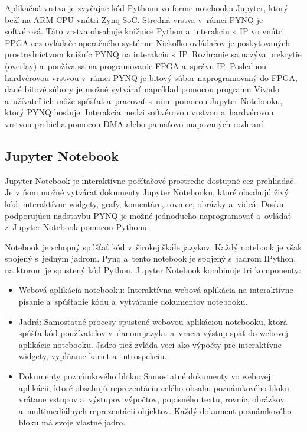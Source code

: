Aplikačná vrstva je zvyčajne kód Pythonu vo forme notebooku Jupyter, ktorý beží na ARM CPU vnútri Zynq SoC. Stredná vrstva v~rámci PYNQ je softvérová. Táto vrstva obsahuje knižnice Python a~interakciu s~IP vo vnútri FPGA cez ovládače operačného systému. Niekoľko ovládačov je poskytovaných prostredníctvom knižníc PYNQ na interakciu s~IP. Rozhranie sa nazýva prekrytie (overlay) a~používa sa na programovanie FPGA a~správu IP. Poslednou hardvérovou vrstvou v~rámci PYNQ je bitový súbor naprogramovaný do FPGA, dané bitové súbory je možné vytvárať napríklad pomocou programu Vivado a~užívateľ ich môže spúšťať a~pracovať s~nimi pomocou Jupyter Notebooku, ktorý PYNQ hosťuje. Interakcia medzi softvérovou vrstvou a~hardvérovou vrstvou prebieha pomocou DMA alebo pamäťovo mapovaných rozhraní.~\cite{BjergeKim2021Asae}

\subsection{Jupyter Notebook}
Jupyter Notebook je interaktívne počítačové prostredie dostupné cez prehliadač. Je v ňom možné vytvárať dokumenty Jupyter Notebooku, ktoré obsahujú živý kód, interaktívne widgety, grafy, komentáre, rovnice, obrázky a~videá. Dosku podporujúcu nadstavbu PYNQ je možné jednoducho naprogramovať a~ovládať z~Jupyter Notebook pomocou Pythonu.

Notebook je schopný spúšťať kód v~širokej škále jazykov. Každý notebook je však spojený s~jedným jadrom. Pynq a~tento notebook je spojený s~jadrom IPython, na ktorom je spustený kód Python.
Jupyter Notebook kombinuje tri komponenty:
\begin{itemize}
    \item Webová aplikácia notebooku: Interaktívna webová aplikácia na interaktívne písanie a~spúšťanie kódu a~vytváranie dokumentov notebooku.
    \item Jadrá: Samostatné procesy spustené webovou aplikáciou notebooku, ktorá spúšťa kód používateľov v~danom jazyku a~vracia výstup späť do webovej aplikácie notebooku. Jadro tiež zvláda veci ako výpočty pre interaktívne widgety, vypĺňanie kariet a~introspekciu.
    \item Dokumenty poznámkového bloku: Samostatné dokumenty vo webovej aplikácii, ktoré obsahujú reprezentáciu celého obsahu poznámkového bloku vrátane vstupov a~výstupov výpočtov, popisného textu, rovníc, obrázkov a~multimediálnych reprezentácií objektov. Každý dokument poznámkového bloku má svoje vlastné jadro.
\end{itemize}

